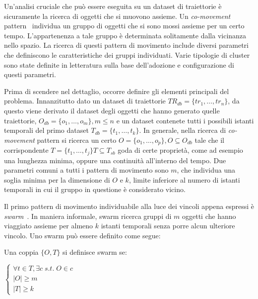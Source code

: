 Un'analisi cruciale che può essere eseguita su un dataset di traiettorie è sicuramente
la ricerca di oggetti che si muovono assieme.
Un \textit{co-movement} pattern~\cite{zheng2015trajectory} individua un gruppo di oggetti che si sono mossi assieme
per un certo tempo.
L'appartenenza a tale gruppo è determinata solitamente dalla vicinanza nello
spazio.
La ricerca di questi pattern di movimento include diversi parametri che definiscono le
caratteristiche dei gruppi individuati.
Varie tipologie di cluster sono state definite
in letteratura sulla base dell'adozione e configurazione di questi parametri.

Prima di scendere nel dettaglio, occorre definire gli elementi principali del problema.
Innanzitutto dato un dataset di traiettorie \(TR_{db} = \{tr_{1}, \ldots, tr_{n}\} \), da questo viene derivato il dataset
degli oggetti che hanno generato quelle traiettorie, \(O_{db} = \{ o_{1}, \ldots, o_{m} \}, m \leq n\)
e un dataset contenete tutti i possibili istanti temporali del primo dataset
\(T_{db} = \{t_{1}, \ldots, t_{k}\} \).
In generale, nella ricerca di \textit{co-movement} pattern si ricerca un certo \(O = \{ o_{1}, \ldots, o_{p} \}, O \subseteq O_{db} \)
tale che il corrispondente \(T = \{t_{1}, \ldots, t_{j}\} T \subseteq T_{sb}\) goda di certe proprietà, come
ad esempio una lunghezza minima, oppure una continuità all'interno del tempo.
Due parametri comuni a tutti i pattern di movimento sono \(m\), che individua una
soglia minima per la dimensione di \(O\) e \(k\), limite inferiore al numero
di istanti temporali in cui il gruppo in questione è considerato vicino.

Il primo pattern di movimento individuabile alla luce dei vincoli appena espressi è \textit{swarm}~\cite{li2010swarm}.
In maniera informale, swarm ricerca gruppi di \(m\) oggetti che hanno viaggiato assieme per almeno \(k\) istanti temporali senza porre alcun ulteriore vincolo.
Uno swarm può essere definito come segue:

\begin{definition}[Swarm]\label{definition:swarm}

  Una coppia \( \{ O, T \} \) si definisce swarm se:

  \begin{center}

    \(
      \begin{cases}
         \forall t \in T,\exists c \; s.t. \; O \in c \\
         |O| \geq m \\
         |T| \geq k

      \end{cases}
      \)

  \end{center}
\end{definition}

